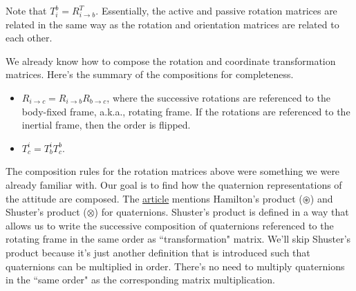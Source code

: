 Note that $T_{i}^b = R_{i \rightarrow b}^{T}$. Essentially, the active and passive rotation matrices are related in the same way as the rotation and orientation matrices are related to each other.

We already know how to compose the rotation and coordinate transformation matrices. Here's the summary of the compositions for completeness.
\begin{itemize}
    \item $R_{i \rightarrow c} = R_{i \rightarrow b} R_{b \rightarrow c}$, where the successive rotations are referenced to the body-fixed frame, a.k.a., rotating frame. If the rotations are referenced to the inertial frame, then the order is flipped.
    \item $T_{c}^i = T_{b}^i T_{c}^b$.
\end{itemize}

The composition rules for the rotation matrices above were something we were already familiar with. Our goal is to find how the quaternion representations of the attitude are composed. The \href{https://sites.utexas.edu/near/files/2022/07/Rotations.pdf}{article} mentions Hamilton's product ($\circledast$) and Shuster's product ($\otimes$) for quaternions. Shuster's product is defined in a way that allows us to write the successive composition of quaternions referenced to the rotating frame in the same order as ``transformation" matrix. We'll skip Shuster's product because it's just another definition that is introduced such that quaternions can be multiplied in order. There's no need to multiply quaternions in the ``same order" as the corresponding matrix multiplication.

